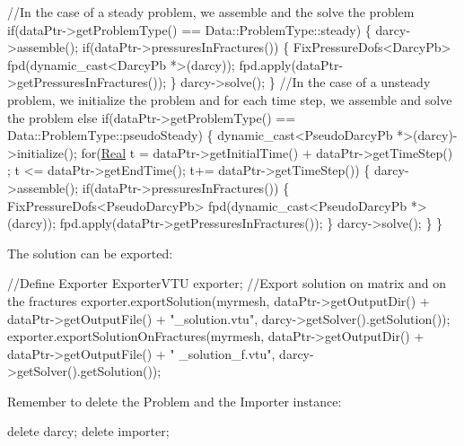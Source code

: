 \begin{DoxyCode}
  \textcolor{comment}{//In the case of a steady problem, we assemble and the solve the problem}
  \textcolor{keywordflow}{if}(dataPtr->getProblemType() == Data::ProblemType::steady)
  \{
      darcy->assemble();
      \textcolor{keywordflow}{if}(dataPtr->pressuresInFractures())
      \{
          FixPressureDofs<DarcyPb> fpd(dynamic\_cast<DarcyPb *>(darcy));
          fpd.apply(dataPtr->getPressuresInFractures());
      \}
      darcy->solve();
  \}
  \textcolor{comment}{//In the case of a unsteady problem, we initialize the problem and for each time step, we assemble and
       solve the}
problem
  \textcolor{keywordflow}{else} \textcolor{keywordflow}{if}(dataPtr->getProblemType() == Data::ProblemType::pseudoSteady)
  \{
      \textcolor{keyword}{dynamic\_cast<}PseudoDarcyPb *\textcolor{keyword}{>}(darcy)->initialize();
      \textcolor{keywordflow}{for}(\hyperlink{namespaceFVCode3D_a40c1f5588a248569d80aa5f867080e83}{Real} t = dataPtr->getInitialTime() + dataPtr->getTimeStep() ; t <= dataPtr->getEndTime(); t+=
      dataPtr->getTimeStep())
      \{
          darcy->assemble();
          \textcolor{keywordflow}{if}(dataPtr->pressuresInFractures())
          \{
              FixPressureDofs<PseudoDarcyPb> fpd(dynamic\_cast<PseudoDarcyPb *>(darcy));
              fpd.apply(dataPtr->getPressuresInFractures());
          \}
          darcy->solve();
      \}
  \}
\end{DoxyCode}


The solution can be exported\+:


\begin{DoxyCode}
\textcolor{comment}{//Define Exporter}
ExporterVTU exporter;
\textcolor{comment}{//Export solution on matrix and on the fractures}
exporter.exportSolution(myrmesh, dataPtr->getOutputDir() + dataPtr->getOutputFile() + \textcolor{stringliteral}{"\_solution.vtu"}, 
      darcy->getSolver().getSolution());
exporter.exportSolutionOnFractures(myrmesh, dataPtr->getOutputDir() + dataPtr->getOutputFile() + \textcolor{stringliteral}{"
      \_solution\_f.vtu"}, darcy->getSolver().getSolution());
\end{DoxyCode}


Remember to delete the Problem and the Importer instance\+:


\begin{DoxyCode}
\textcolor{keyword}{delete} darcy;
\textcolor{keyword}{delete} importer;
\end{DoxyCode}
 